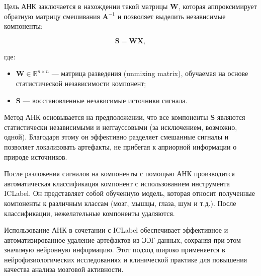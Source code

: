 Цель АНК заключается в нахождении такой матрицы \(\mathbf{W}\), которая аппроксимирует обратную матрицу смешивания \(\mathbf{A}^{-1}\) и позволяет выделить независимые компоненты:

\begin{equation}
\mathbf{S} = \mathbf{W} \mathbf{X},
\label{eq:ica_unmixing}
\end{equation}

где:
\begin{itemize}
    \item \(\mathbf{W} \in \mathbb{R}^{n \times n}\) — матрица разведения (unmixing matrix), обучаемая на основе статистической независимости компонент;
    \item \(\mathbf{S}\) — восстановленные независимые источники сигнала.
\end{itemize}

Метод АНК основывается на предположении, что все компоненты \(\mathbf{S}\) являются статистически независимыми и неггауссовыми (за исключением, возможно, одной). Благодаря этому он эффективно разделяет смешанные сигналы и позволяет локализовать артефакты, не прибегая к априорной информации о природе источников.

После разложения сигналов на компоненты с помощью АНК производится автоматическая классификация компонент с использованием инструмента ICLabel. Он представляет собой обученную модель, которая относит полученные компоненты к различным классам (мозг, мышцы, глаза, шум и т.д.). После классификации, нежелательные компоненты удаляются.

Использование АНК в сочетании с ICLabel обеспечивает эффективное и автоматизированное удаление артефактов из ЭЭГ-данных, сохраняя при этом значимую нейронную информацию. Этот подход широко применяется в нейрофизиологических исследованиях и клинической практике для повышения качества анализа мозговой активности.

\endinput